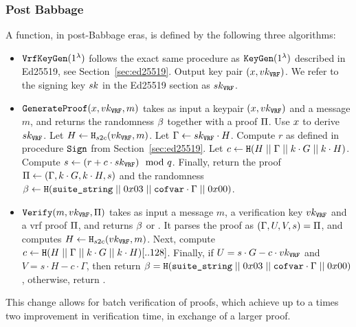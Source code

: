 \subsubsection{Post Babbage}
A \vrf function, in post-Babbage eras, is defined by the following three algorithms:
\begin{itemize}
\item $\texttt{VrfKeyGen}(1^\lambda)$ follows the exact same procedure as $\texttt{KeyGen}(1^\lambda)$ described in Ed25519, see Section~\ref{sec:ed25519}. Output key pair $(x, vk_{\texttt{VRF}})$. We refer to the signing key $sk$ in the Ed25519 section as $sk_{\texttt{VRF}}$.
\item $\texttt{GenerateProof}(x, vk_{\texttt{VRF}}, m)$ takes as input a keypair $(x, vk_{\texttt{VRF}})$ and a message $m$, and returns the \vrf randomness $\beta$ together with a proof $\Pi$. Use $x$ to derive $sk_{\texttt{VRF}}$. Let $H \gets \texttt{H}_{s2c}(vk_{\texttt{VRF}}, m)$. Let $\Gamma \gets sk_{\texttt{VRF}}\cdot H$. Compute $r$ as defined in procedure $\texttt{Sign}$ from Section~\ref{sec:ed25519}. Let $c \gets \texttt{H}(H\;||\;\Gamma\;||\; k\cdot G\;||\; k\cdot H)$. Compute $s \gets (r + c\cdot sk_{\texttt{VRF}})\mod{q}$. Finally, return the proof $\Pi \gets (\Gamma, k\cdot G, k\cdot H, s)$ and the randomness $\beta \gets  \texttt{H}(\texttt{suite\_string}\;||\; 0x03\;||\;\texttt{cofvar}\cdot\Gamma\;||\; 0x00)$.
\item $\texttt{Verify}(m, vk_{\texttt{VRF}}, \Pi)$ takes as input a message $m$, a verification key $vk_{\texttt{VRF}}$ and a vrf proof $\Pi$, and returns $\beta$ or \false. It parses the proof as $(\Gamma, U, V, s) = \Pi$, and computes $H\gets\texttt{H}_{s2c}(vk_{\texttt{VRF}}, m)$. Next, compute $c \gets \texttt{H}(H\;||\;\Gamma\;||\; k\cdot G\;||\; k\cdot H)[..128]$. Finally, if $U = s\cdot G - c\cdot vk_{\texttt{VRF}}$ and $V = s\cdot H - c\cdot\Gamma$, then return $\beta =  \texttt{H}(\texttt{suite\_string}\;||\; 0x03\;||\;\texttt{cofvar}\cdot\Gamma\;||\; 0x00)$, otherwise, return \false.
\end{itemize}

This change allows for batch verification of proofs, which achieve up to a times two improvement in verification time, in exchange of a larger proof.
